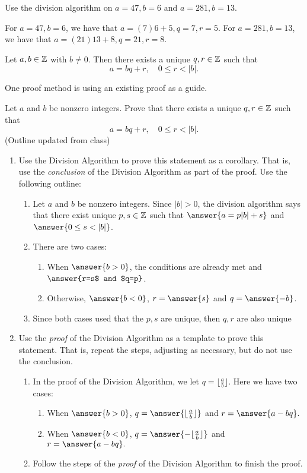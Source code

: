 \documentclass{ximera}
\begin{document}
\begin{br}
 Use the division algorithm on $a=47, b=6$ and $a=281, b=13$.
\end{br}
\begin{solution}
For $a=47, b=6$, we have that $a=(7)6+5, q=7, r=5$.
For $a=281, b=13$, we have that $a=(21)13+8, q=21, r=8$.
\end{solution}

\begin{cor}
 Let $a,b\in\mathbb Z$ with $b\neq0$. Then there exists a unique $q,r\in\mathbb Z$ such that \[a=bq+r, \quad 0\leq r <|b|.\]
\end{cor}
One proof method is using an existing proof as a guide.

\begin{br}  Let $a$ and $b$ be nonzero integers. Prove that there exists a unique $q,r\in\mathbb Z$ such that 
  \[a=bq+r, \quad 0\leq r <|b|.\]
(Outline updated from class)
  \begin{enumerate}
    	\item Use the Division Algorithm to prove this statement as a corollary. That is, use the \emph{conclusion} of the Division Algorithm as part of the proof.  Use the following outline:
    	\begin{enumerate}
		\item  Let $a$ and $b$ be nonzero integers. Since $|b|>0$, the division algorithm says that there exist unique $p,s\in\mathbb Z$ such that $\answer{a=p|b|+s}$ and $\answer{0\leq s<|b|}$.
      		\item There are two cases:
      		\begin{enumerate}
        			\item When $\answer{b>0}$, the conditions are already met and $\answer{r=s$ and $q=p}$.
        			\item Otherwise, $\answer{b<0}$, $r=\answer{s}$ and $q=\answer{-b}$.
      		\end{enumerate}
      		\item Since both cases used that the $p,s$ are unique, then $q,r$ are also unique
	\end{enumerate}
    	\item Use the \emph{proof} of the Division Algorithm as a template to prove this statement. That is, repeat the steps, adjusting as necessary, but do not use the conclusion.
    	\begin{enumerate}
    		\item In the proof of the Division Algorithm, we let $q=\lfloor\frac{a}{b}\rfloor$. Here we have two cases:
    		\begin{enumerate}
      			\item When $\answer{b>0}$, $q=\answer{\lfloor\frac{a}{b}\rfloor}$ and $r=\answer{a-bq}.$
      			\item When $\answer{b<0}$, $q=\answer{-\lfloor\frac{a}{b}\rfloor}$ and $r=\answer{a-bq}.$   
		\end{enumerate}
    		\item Follow the steps of the \emph{proof} of the Division Algorithm to finish the proof.
    	\end{enumerate}


\end{enumerate}
\end{br}
\end{document}
